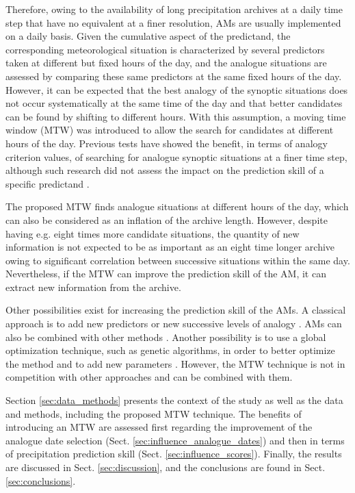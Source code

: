 \documentclass[hess, manuscript]{copernicus}
\begin{document}
	Therefore, owing to the availability of long precipitation archives at a daily time step that have no equivalent at a finer resolution, AMs are usually implemented on a daily basis. Given the cumulative aspect of the predictand, the corresponding meteorological situation is characterized by several predictors taken at different but fixed hours of the day, and the analogue situations are assessed by comparing these same predictors at the same fixed hours of the day. However, it can be expected that the best analogy of the synoptic situations does not occur systematically at the same time of the day and that better candidates can be found by shifting to different hours. With this assumption, a moving time window (MTW) was introduced to allow the search for candidates at different hours of the day. Previous tests have showed the benefit, in terms of analogy criterion values, of searching for analogue synoptic situations at a finer time step, although such research did not assess the impact on the prediction skill of a specific predictand \citep{Finet2008}.
	
	The proposed MTW finds analogue situations at different hours of the day, which can also be considered as an inflation of the archive length. However, despite having e.g. eight times more candidate situations, the quantity of new information is not expected to be as important as an eight time longer archive owing to significant correlation between successive situations within the same day. Nevertheless, if the MTW can improve the prediction skill of the AM, it can extract new information from the archive.
	
	Other possibilities exist for increasing the prediction skill of the AMs. A classical approach is to add new predictors or new successive levels of analogy \citep[e.g.][]{Horton2012a, BenDaoud2016, Caillouet2016}. AMs can also be combined with other methods \citep[e.g.][]{Chardon2014}. Another possibility is to use a global optimization technique, such as genetic algorithms, in order to better optimize the method and to add new parameters \citep{Horton2017}. However, the MTW technique is not in competition with other approaches and can be combined with them.
	
	Section \ref{sec:data_methods} presents the context of the study as well as the data and methods, including the proposed MTW technique. The benefits of introducing an MTW are assessed first regarding the improvement of the analogue date selection (Sect. \ref{sec:influence_analogue_dates}) and then in terms of precipitation prediction skill (Sect. \ref{sec:influence_scores}). Finally, the results are discussed in Sect. \ref{sec:discussion}, and the conclusions are found in Sect. \ref{sec:conclusions}.
	
\end{document}
